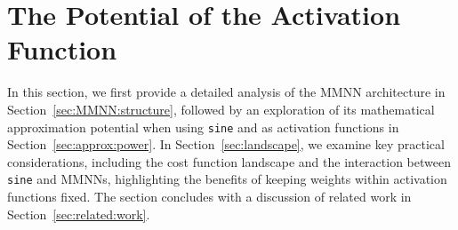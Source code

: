 \documentclass[11pt,a4paper]{article}
\begin{document}





\section{The Potential of the \Sine{} Activation Function}
\label{sec:sine:potential}

In this section, we first provide a detailed analysis of the MMNN architecture in Section~\ref{sec:MMNN:structure}, followed by an exploration of its mathematical approximation potential when using \texttt{sine} and  as activation functions in Section~\ref{sec:approx:power}. In Section~\ref{sec:landscape}, we examine key practical considerations, including the cost function landscape and the interaction between \texttt{sine} and MMNNs, highlighting the benefits of keeping weights within activation functions fixed. 
The section concludes with a discussion of related work in Section~\ref{sec:related:work}.








\end{document}
